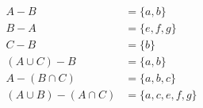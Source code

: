 \documentclass[12pt]{article}
\begin{document}
\section{}
	\begin{align*}
		A - B &= \{a,b\} \\
		B - A &= \{e,f,g\} \\
		C - B &= \{b\} \\
		(A \cup C) - B &= \{a,b\} \\
		A - (B \cap C) &= \{a,b,c\} \\
		(A \cup B) - (A \cap C) &= \{a,c,e,f,g\}
	\end{align*}

\section{}
\end{document}

